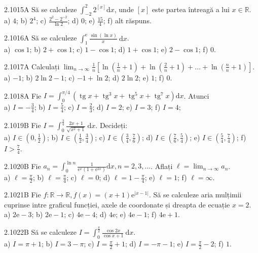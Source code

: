 \documentclass[11pt]{article}
\begin{document}
2.1015A Să se calculeze $\int_{-2}^{2} 2^{[x]} \mathrm{d} x$, unde $[x]$ este partea întreagă a lui $x \in \mathbb{R}$.\\ a) $4$; b) $2^{4}$; c) $\frac{2^{2}-2^{-2}}{\ln 2}$; d) $0$; e) $\frac{15}{4}$; f) alt răspuns.

2.1016A Să se calculeze $\int_{1}^{\mathrm{e}} \frac{\sin (\ln x)}{x} \mathrm{~d} x$.\\ a) $\cos 1$; b) $2+\cos 1$; c) $1-\cos 1$; d) $1+\cos 1$; e) $2-\cos 1$; f) $0$.

2.1017A Calculați $\lim _{n \rightarrow \infty} \frac{1}{n}\left[\ln \left(\frac{1}{n}+1\right)+\ln \left(\frac{2}{n}+1\right)+\ldots+\ln \left(\frac{n}{n}+1\right)\right]$.\\ a) $-1$; b) $2 \ln 2-1$; c) $-1+\ln 2$; d) $2 \ln 2$; e) $1$; f) $0$.

2.1018A Fie $I=\int_{0}^{\pi / 4}\left(\operatorname{tg} x+\operatorname{tg}^{3} x+\operatorname{tg}^{5} x+\operatorname{tg}^{7} x\right) \mathrm{d} x$. Atunci\\ a) $I=-\frac{3}{4}$; b) $I=\frac{5}{4}$; c) $I=\frac{2}{3}$; d) $I=2$; e) $I=3$; f) $I=4$;

2.1019B Fie $I=\int_{0}^{\frac{3}{4}} \frac{2 x+1}{\sqrt{x^{2}+1}} \mathrm{~d} x$. Decideți:\\ a) $I \in\left(0, \frac{1}{2}\right)$; b) $I \in\left(\frac{1}{2}, \frac{3}{4}\right)$; c) $I \in\left(\frac{3}{4}, \frac{7}{6}\right)$; d) $I \in\left(\frac{7}{6}, \frac{5}{4}\right)$; e) $I \in\left(\frac{5}{4}, \frac{7}{4}\right)$; f) $I>\frac{7}{4}$.

2.1020B Fie $a_{n}=\int_{0}^{\ln n} \frac{1}{\mathrm{e}^{x}\left(1+\mathrm{e}^{2 x}\right)} \mathrm{d} x, n=2,3, \ldots$. Aflați $\ell=\lim _{n \rightarrow \infty} a_{n}$.\\ a) $\ell=\frac{\pi}{2}$; b) $\ell=\frac{\pi}{4}$; c) $\ell=0$; d) $\ell=1-\frac{\pi}{4}$; e) $\ell=1$; f) $\ell=\infty$.

2.1021B Fie $f: \mathbb{R} \rightarrow \mathbb{R}, f(x)=(x+1) \mathrm{e}^{|x-1|}$. Să se calculeze aria mulțimii cuprinse intre graficul funcției, axele de coordonate și dreapta de ecuație $x=2$.\\ a) $2 \mathrm{e}-3$; b) $2 \mathrm{e}-1$; c) $4 \mathrm{e}-4$; d) $4 \mathrm{e}$; e) $4 \mathrm{e}-1$; f) $4 \mathrm{e}+1$.

2.1022B Să se calculeze $I=\int_{0}^{\frac{\pi}{2}} \frac{\cos 2 x}{\cos x+1} \mathrm{~d} x$.\\ a) $I=\pi+1$; b) $I=3-\pi$; c) $I=\frac{\pi}{2}+1$; d) $I=-\pi-1$; e) $I=\frac{\pi}{2}-2$; f) $1$. 
\end{document}
